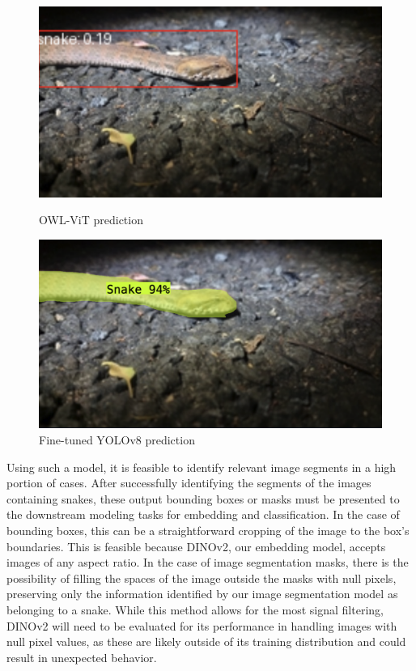 \documentclass[]{ceurart}
\begin{document}
\begin{figure}[htbp]
    \centering
    \begin{minipage}{0.49\textwidth}
        \centering
        \includegraphics[width=\linewidth]{media/owl-vit.png}
        \caption{OWL-ViT prediction}
        \label{fig:sam-snake}
    \end{minipage}\hfill
    \begin{minipage}{0.49\textwidth}
        \centering
        \includegraphics[width=\linewidth]{media/fine-tuned-yolo.png}
        \caption{Fine-tuned YOLOv8 prediction}
        \label{fig:enter-caption}
    \end{minipage}
\end{figure}

Using such a model, it is feasible to identify relevant image segments in a high portion of cases.
After successfully identifying the segments of the images containing snakes, these output bounding boxes or masks must be presented to the downstream modeling tasks for embedding and classification. 
In the case of bounding boxes, this can be a straightforward cropping of the image to the box's boundaries. 
This is feasible because DINOv2, our embedding model, accepts images of any aspect ratio. 
In the case of image segmentation masks, there is the possibility of filling the spaces of the image outside the masks with null pixels, preserving only the information identified by our image segmentation model as belonging to a snake. 
While this method allows for the most signal filtering, DINOv2 will need to be evaluated for its performance in handling images with null pixel values, as these are likely outside of its training distribution and could result in unexpected behavior. 
\end{document}
